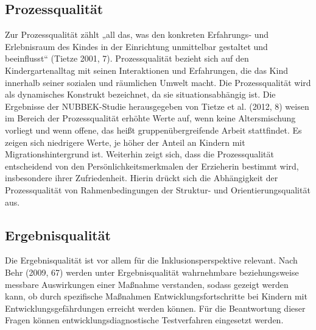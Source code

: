 \subsection{Prozessqualität}\label{Prozessqualität}
Zur Prozessqualität zählt „all das, was den konkreten Erfahrungs- und Erlebnisraum des Kindes in der Einrichtung unmittelbar gestaltet und beeinflusst“ (Tietze 2001, 7). Prozessqualität bezieht sich auf den Kindergartenalltag mit seinen Interaktionen und Erfahrungen, die das Kind innerhalb seiner sozialen und räumlichen Umwelt macht. Die Prozessqualität wird als dynamisches Konstrukt bezeichnet, da sie situationsabhängig ist. Die Ergebnisse der NUBBEK-Studie herausgegeben von Tietze et al. (2012, 8) weisen im Bereich der Prozessqualität erhöhte Werte auf, wenn keine Altersmischung vorliegt und wenn offene, das heißt gruppenübergreifende Arbeit stattfindet. Es zeigen sich niedrigere Werte, je höher der Anteil an Kindern mit Migrationshintergrund ist. Weiterhin zeigt sich, dass die Prozessqualität entscheidend von den Persönlichkeitsmerkmalen der Erzieherin bestimmt wird, insbesondere ihrer Zufriedenheit. Hierin drückt sich die Abhängigkeit der Prozessqualität von Rahmenbedingungen der Struktur- und Orientierungsqualität aus.   

\subsection{Ergebnisqualität}
Die Ergebnisqualität ist vor allem für die Inklusionsperspektive relevant. Nach Behr (2009, 67) werden unter Ergebnisqualität  wahrnehmbare beziehungsweise messbare Auswirkungen einer Maßnahme verstanden, sodass gezeigt werden kann, ob durch spezifische Maßnahmen Entwicklungsfortschritte bei Kindern mit Entwicklungsgefährdungen erreicht werden können. Für die Beantwortung dieser Fragen können entwicklungsdiagnostische Testverfahren eingesetzt werden.


